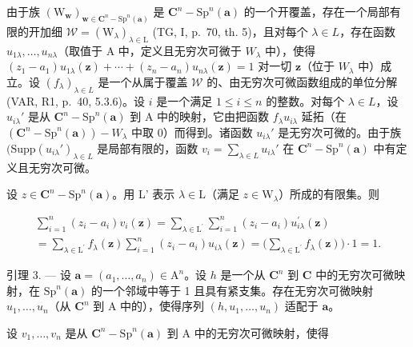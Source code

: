 由于族 \((\mathrm{W}_{\boldsymbol{w}})_{\boldsymbol{w}\in\mathbf{C}^{n}-\mathrm{Sp}^{n}(\boldsymbol{a})}\) 是 \(\mathbf{C}^{n}-\mathrm{Sp}^{n}(\boldsymbol{a})\) 的一个开覆盖，存在一个局部有限的开加细 \(\mathscr{W}=(\mathrm{W}_{\lambda})_{\lambda\in\mathrm{L}}\) (TG, I, p.~70, th. 5)，且对每个 \(\lambda\in L\)，存在函数 \(u_{1\lambda},\ldots,u_{n\lambda}\)（取值于 A 中，定义且无穷次可微于 \(W_{\lambda}\) 中），使得 \((z_{1}-a_{1})u_{1\lambda}(\boldsymbol{z})+\cdots+(z_{n}-a_{n})u_{n\lambda}(\boldsymbol{z})=1\) 对一切 \(\boldsymbol{z}\)（位于 \(W_{\lambda}\) 中）成立。设 \((f_{\lambda})_{\lambda \in L}\) 是一个从属于覆盖 \(\mathscr{W}\) 的、由无穷次可微函数组成的单位分解 (VAR, R1, p.~40, 5.3.6)。设 \(i\) 是一个满足 \(1 \leqslant i \leqslant n\) 的整数。对每个 \(\lambda \in L\)，设 \(u_{i\lambda}'\) 是从 \(\mathbf{C}^n - \mathrm{Sp}^n(\boldsymbol{a})\) 到 A 中的映射，它由把函数 \(f_{\lambda}u_{i\lambda}\) 延拓（在 \((\mathbf{C}^n - \mathrm{Sp}^n(\boldsymbol{a})) - W_{\lambda}\) 中取 0）而得到。诸函数 \(u_{i\lambda}'\) 是无穷次可微的。由于族 \((\mathrm{Supp}(u_{i\lambda}')_{\lambda \in L}\) 是局部有限的，函数 \(v_i = \sum_{\lambda \in L} u_{i\lambda}'\) 在 \(\mathbf{C}^n - \mathrm{Sp}^n(\boldsymbol{a})\) 中有定义且无穷次可微。

设 \(z \in \mathbf{C}^n - \mathrm{Sp}^n(\boldsymbol{a})\)。用 L' 表示 \(\lambda \in \mathrm{L}\)（满足 \(z \in \mathrm{W}_{\lambda}\)）所成的有限集。则

\[
\begin{array}{c} \sum_ {i = 1} ^ {n} (z _ {i} - a _ {i}) v _ {i} (\boldsymbol {z}) = \sum_ {\lambda \in \mathrm{L} ^ {\prime}} \sum_ {i = 1} ^ {n} (z _ {i} - a _ {i}) u _ {i \lambda} ^ {\prime} (\boldsymbol {z}) \\ = \sum_ {\lambda \in \mathrm{L} ^ {\prime}} f _ {\lambda} (\boldsymbol {z}) \sum_ {i = 1} ^ {n} (z _ {i} - a _ {i}) u _ {i \lambda} (\boldsymbol {z}) = \bigg (\sum_ {\lambda \in \mathrm{L} ^ {\prime}} f _ {\lambda} (\boldsymbol {z}) \bigg) \cdot 1 = 1. \end{array}
\]

引理 3. --- 设 \(\boldsymbol{a} = (a_{1},\ldots ,a_{n})\in \mathrm{A}^{n}\)。设 \(h\) 是一个从 \(\mathbf{C}^n\) 到 \(\mathbf{C}\) 中的无穷次可微映射，在 \(\mathrm{Sp}^n (\boldsymbol {a})\) 的一个邻域中等于 1 且具有紧支集。存在无穷次可微映射 \(u_{1},\ldots ,u_{n}\)（从 \(\mathbf{C}^n\) 到 A 中的），使得序列 \((h,u_1,\dots,u_n)\) 适配于 \(\boldsymbol{a}\)。

设 \(v_{1},\ldots,v_{n}\) 是从 \(\mathbf{C}^{n}-\mathrm{Sp}^{n}(\boldsymbol{a})\) 到 A 中的无穷次可微映射，使得

